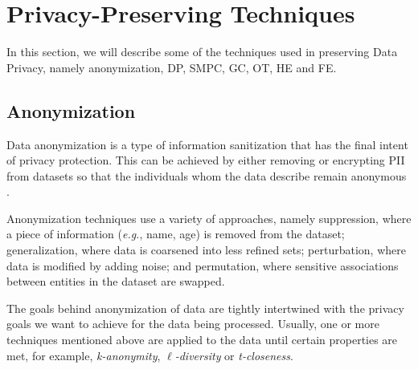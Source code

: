\section{Privacy-Preserving Techniques}
\label{sec:PrivacyPreservingTechniques}


 In this section, we will describe some of the techniques used in preserving Data Privacy, namely anonymization, \ac{DP}, \ac{SMPC}, \ac{GC}, \ac{OT}, \ac{HE} and \ac{FE}.


\subsection{Anonymization}
\label{ssec:Anonymization}


Data anonymization is a type of information sanitization that has the final intent of privacy protection. This can be achieved by either removing or encrypting \ac{PII} from datasets so that the individuals whom the data describe remain anonymous \cite{raghunathan2013}.

Anonymization techniques use a variety of approaches, namely suppression, where a piece of information (\textit{e.g.}, name, age) is removed from the dataset; generalization, where data is coarsened into less refined sets; perturbation, where data is modified by adding noise; and permutation, where sensitive associations between entities in the dataset are swapped.

The goals behind anonymization of data are tightly intertwined with the privacy goals we want to achieve for the data being processed. Usually, one or more techniques mentioned above are applied to the data until certain properties are met, for example, \textit{k-anonymity}, $\ell$\textit{-diversity} or \textit{t-closeness}.

